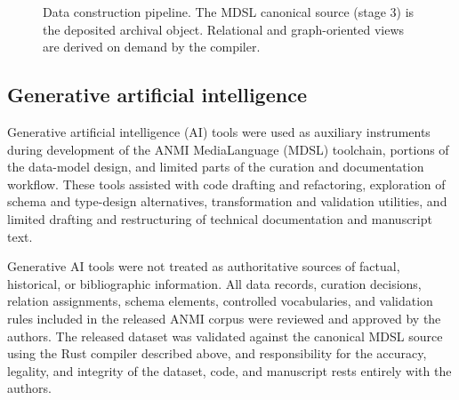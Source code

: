 \documentclass[11pt]{article}
\begin{document}
\begin{figure}[t]
  \centering
  \caption{Data construction pipeline. The MDSL canonical source (stage 3) is the deposited archival object. Relational and graph-oriented views are derived on demand by the compiler.}
  \label{fig:pipeline}
\end{figure}

\subsection{Generative artificial intelligence}

Generative artificial intelligence (AI) tools were used as auxiliary instruments during development of the ANMI MediaLanguage (MDSL) toolchain, portions of the data-model design, and limited parts of the curation and documentation workflow. These tools assisted with code drafting and refactoring, exploration of schema and type-design alternatives, transformation and validation utilities, and limited drafting and restructuring of technical documentation and manuscript text.

Generative AI tools were not treated as authoritative sources of factual, historical, or bibliographic information. All data records, curation decisions, relation assignments, schema elements, controlled vocabularies, and validation rules included in the released ANMI corpus were reviewed and approved by the authors. The released dataset was validated against the canonical MDSL source using the Rust compiler described above, and responsibility for the accuracy, legality, and integrity of the dataset, code, and manuscript rests entirely with the authors.
\end{document}

